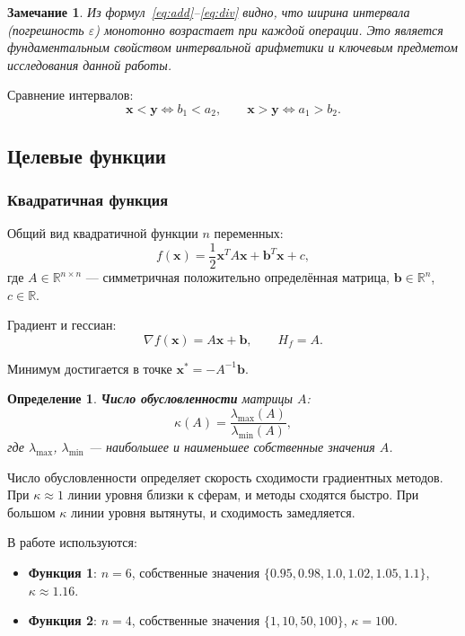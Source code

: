\documentclass[a4paper, 14pt]{extarticle}
\newtheorem{definition}{Определение}
\newtheorem{remark}{Замечание}
\begin{document}
\begin{remark}
Из формул~\eqref{eq:add}--\eqref{eq:div} видно, что ширина интервала (погрешность $\varepsilon$) монотонно возрастает при каждой операции. Это является фундаментальным свойством интервальной арифметики и ключевым предметом исследования данной работы.
\end{remark}

Сравнение интервалов:
\[
    \mathbf{x} < \mathbf{y} \iff b_1 < a_2, \qquad
    \mathbf{x} > \mathbf{y} \iff a_1 > b_2.
\]

\subsection{Целевые функции}

\subsubsection{Квадратичная функция}

Общий вид квадратичной функции $n$ переменных:
\begin{equation}\label{eq:quadratic}
    f(\mathbf{x}) = \frac{1}{2}\mathbf{x}^T A \mathbf{x} + \mathbf{b}^T \mathbf{x} + c,
\end{equation}
где $A \in \mathbb{R}^{n \times n}$ --- симметричная положительно определённая матрица, $\mathbf{b} \in \mathbb{R}^n$, $c \in \mathbb{R}$.

Градиент и гессиан:
\[
    \nabla f(\mathbf{x}) = A\mathbf{x} + \mathbf{b}, \qquad H_f = A.
\]

Минимум достигается в точке $\mathbf{x}^* = -A^{-1}\mathbf{b}$.

\begin{definition}
\textbf{Число обусловленности} матрицы $A$:
\[
    \kappa(A) = \frac{\lambda_{\max}(A)}{\lambda_{\min}(A)},
\]
где $\lambda_{\max}$, $\lambda_{\min}$ --- наибольшее и наименьшее собственные значения $A$.
\end{definition}

Число обусловленности определяет скорость сходимости градиентных методов. При $\kappa \approx 1$ линии уровня близки к сферам, и методы сходятся быстро. При большом $\kappa$ линии уровня вытянуты, и сходимость замедляется.

В работе используются:
\begin{itemize}
    \item \textbf{Функция 1}: $n=6$, собственные значения $\{0.95, 0.98, 1.0, 1.02, 1.05, 1.1\}$, $\kappa \approx 1.16$.
    \item \textbf{Функция 2}: $n=4$, собственные значения $\{1, 10, 50, 100\}$, $\kappa = 100$.
\end{itemize}
\end{document}
